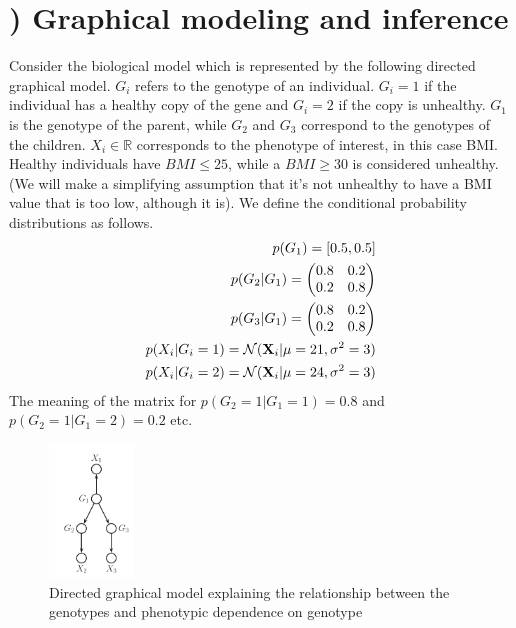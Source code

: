 \documentclass[11pt]{article}
\newcommand{\X}{{\bf X}}
\newcounter{QuestionCounter}
\begin{document}
\section*{) Graphical modeling and inference}
Consider the biological model which is represented by the following directed graphical model. $G_i$ refers to the genotype of an individual. $G_i = 1$ if the individual has a healthy copy of the gene and $G_i = 2$ if the copy is unhealthy. $G_1$ is the genotype of the parent, while $G_2$ and $G_3$ correspond to the genotypes of the children. $X_i \in \mathbb{R}$ corresponds to the phenotype of interest, in this case BMI. Healthy individuals have $BMI \leq 25$, while a $BMI \geq 30$ is considered unhealthy. (We will make a simplifying assumption that it's not unhealthy to have a BMI value that is too low, although it is). We define the conditional probability distributions as follows. 
\begin{align}
    p(G_1) = [0.5, 0.5] \\
    p(G_2 |G_1) = \begin{pmatrix}
    0.8 & 0.2\\
    0.2 & 0.8\\
    \end{pmatrix} \\
    p(G_3 |G_1) = \begin{pmatrix}
    0.8 & 0.2\\
    0.2 & 0.8\\
    \end{pmatrix} \\
    p(X_i | G_i = 1) = \mathcal{N}(\X_i | \mu = 21, \sigma^2 = 3) \\
    p(X_i | G_i = 2) = \mathcal{N}(\X_i | \mu = 24, \sigma^2 = 3)
\end{align}
The meaning of the matrix for $p(G_2 = 1|G_1 = 1) = 0.8$ and $p(G_2 = 1|G_1 = 2) = 0.2$ etc.
\begin{figure}[h]
    \centering
    \includegraphics[width=0.2\textwidth]{inheritance.png}
    \caption{Directed graphical model explaining the relationship between the genotypes and phenotypic dependence on genotype}
    \label{Fig 3}
\end{figure}
\end{document}
